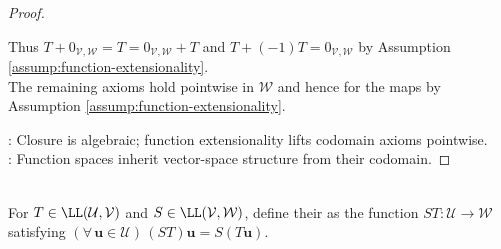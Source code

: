 \begin{proposition}
\begin{proof}
\begin{enumerate}[label=(\roman*)]
Thus $T+0_{\mathcal{V},\mathcal{W}}=T=0_{\mathcal{V},\mathcal{W}}+T$ and $T+(-1)T=0_{\mathcal{V},\mathcal{W}}$ by Assumption \ref{assump:function-extensionality}.\\
The remaining axioms hold pointwise in $\mathcal{W}$ and hence for the maps by Assumption \ref{assump:function-extensionality}.
\end{enumerate}
: Closure is algebraic; function extensionality lifts codomain axioms pointwise.\\
: Function spaces inherit vector-space structure from their codomain.
\end{proof}
\end{proposition}

\begin{definition} \\
For $T\in\LL(\mathcal{U},\mathcal{V})$ and $S\in\LL(\mathcal{V},\mathcal{W})$, define their  as the function $ST:\mathcal{U}\to\mathcal{W}$ satisfying $(\forall\,\mathbf{u}\in\mathcal{U})\,(ST)\mathbf{u}=S(T\mathbf{u})$.
\end{definition}


